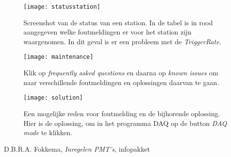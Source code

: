 \begin{figure} 
\centering 
\texttt{[image: statusstation]}
\caption{Screenshot van de status van een station. In de tabel is in rood aangegeven 
welke foutmeldingen er voor het station zijn waargenomen. 
In dit geval is er een probleem met de \emph{TriggerRate}.}\label{fig:statusstation} 
\end{figure}

\begin{figure} 
\centering 
\texttt{[image: maintenance]}
\caption{Klik op \emph{frequently asked questions} en daarna op
         \emph{known issues} om naar verschillende foutmeldingen en
         oplossingen daarvan te gaan.}\label{fig:maintenance} 
\end{figure}
 
\begin{figure} 
\centering 
\texttt{[image: solution]}
\caption{Een mogelijke reden voor foutmelding en de bijhorende
         oplossing. Hier is de oplossing, om in het programma \hisparc
         DAQ op de button \emph{DAQ mode} te klikken.} 
\label{fig:solution} 
\end{figure}


\begin{thebibliography}{9} 	
	 D.B.R.A. Fokkema, \emph{Inregelen PMT's}, infopakket \hisparc 
\end{thebibliography}




